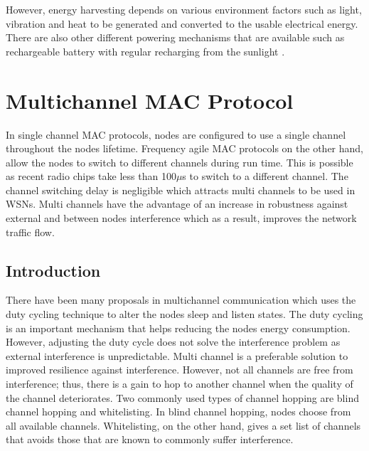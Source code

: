However, energy harvesting depends on various environment factors such as light, vibration and heat to be generated and converted to the usable electrical energy. There are also other different powering mechanisms that are available such as rechargeable battery with regular recharging from the sunlight \cite{macsurvey}. 

\section{Multichannel MAC Protocol}
In single channel MAC protocols, nodes are configured to use a single channel throughout the nodes lifetime. Frequency agile MAC protocols on the other hand, allow the nodes to switch to different channels during run time. This is possible as recent radio chips take less than 100$\mu$s to switch to a different channel. The channel switching delay is negligible which attracts multi channels to be used in WSNs. Multi channels have the advantage of an increase in robustness against external and between nodes interference which as a result, improves the network traffic flow.


\subsection{Introduction}

There have been many proposals in multichannel communication which uses the duty cycling technique to alter the nodes sleep and listen states. The duty cycling is an important mechanism that helps reducing the nodes energy consumption. However, adjusting the duty cycle does not solve the interference problem as external interference is unpredictable. Multi channel is a preferable solution to improved resilience against interference. However, not all channels are free from interference; thus, there is a gain to hop to another channel when the quality of the channel deteriorates. Two commonly used types of channel hopping \cite{watteyne} are blind channel hopping and whitelisting. In blind channel hopping, nodes choose from all available channels. 
Whitelisting, on the other hand, gives a set list of channels that avoids those that are known to commonly suffer interference.

